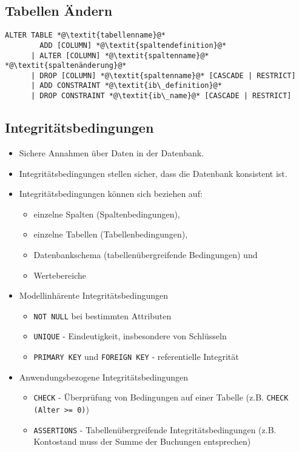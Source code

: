 \documentclass[a4paper, 11pt, accentcolor = tud3b]{tudreport}
\begin{document}
            \subsection{Tabellen Ändern} %
				\begin{lstlisting}
ALTER TABLE *@\textit{tabellenname}@*
		ADD [COLUMN] *@\textit{spaltendefinition}@*
	  | ALTER [COLUMN] *@\textit{spaltenname}@* *@\textit{spaltenänderung}@*
	  | DROP [COLUMN] *@\textit{spaltenname}@* [CASCADE | RESTRICT]
	  | ADD CONSTRAINT *@\textit{ib\_definition}@*
	  | DROP CONSTRAINT *@\textit{ib\_name}@* [CASCADE | RESTRICT]
				\end{lstlisting}

            \subsection{Integritätsbedingungen} %
                \begin{itemize}
                	\item Sichere Annahmen über Daten in der Datenbank.
                	\item Integritätsbedingungen stellen sicher, dass die Datenbank konsistent ist.
                	\item Integritätsbedingungen können sich beziehen auf:
                		\begin{itemize}
                			\item einzelne Spalten (Spaltenbedingungen),
                			\item einzelne Tabellen (Tabellenbedingungen),
                			\item Datenbankschema (tabellenübergreifende Bedingungen) und
                			\item Wertebereiche
                		\end{itemize}
                	\item Modellinhärente Integritätsbedingungen
                		\begin{itemize}
                			\item \lstinline|NOT NULL| bei bestimmten Attributen
                			\item \lstinline|UNIQUE| - Eindeutigkeit, insbesondere von Schlüsseln
                			\item \lstinline|PRIMARY KEY| und \lstinline|FOREIGN KEY| - referentielle Integrität
                		\end{itemize}
                	\item Anwendungsbezogene Integritätsbedingungen
                		\begin{itemize}
                			\item \lstinline|CHECK| - Überprüfung von Bedingungen auf einer Tabelle (z.B. \lstinline|CHECK (Alter >= 0)|)
                			\item \lstinline|ASSERTIONS| - Tabellenübergreifende Integritätsbedingungen (z.B. Kontostand muss der Summe der Buchungen entsprechen)
                		\end{itemize}
                \end{itemize}
\end{document}
